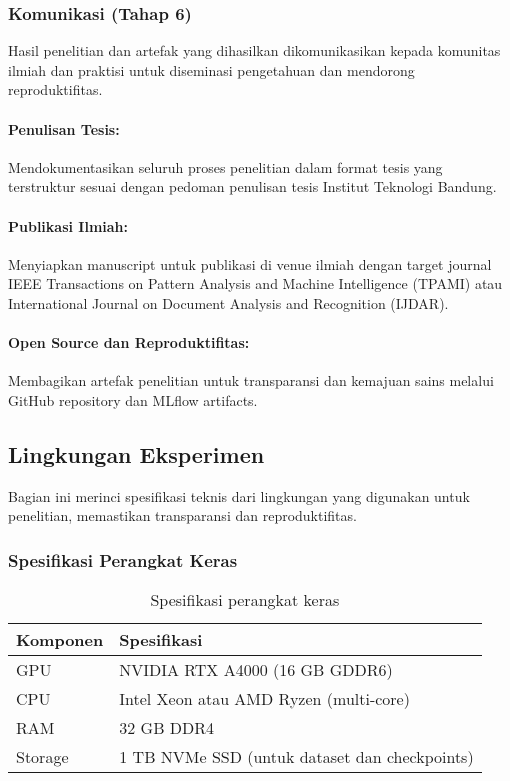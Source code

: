 \documentclass[12pt,a4paper]{article}
\begin{document}
\subsubsection{Komunikasi (Tahap 6)}
Hasil penelitian dan artefak yang dihasilkan dikomunikasikan kepada komunitas ilmiah dan praktisi untuk diseminasi pengetahuan dan mendorong reproduktifitas.

\paragraph{Penulisan Tesis:}
Mendokumentasikan seluruh proses penelitian dalam format tesis yang terstruktur sesuai dengan pedoman penulisan tesis Institut Teknologi Bandung.

\paragraph{Publikasi Ilmiah:}
Menyiapkan manuscript untuk publikasi di venue ilmiah dengan target journal IEEE Transactions on Pattern Analysis and Machine Intelligence (TPAMI) atau International Journal on Document Analysis and Recognition (IJDAR).

\paragraph{Open Source dan Reproduktifitas:}
Membagikan artefak penelitian untuk transparansi dan kemajuan sains melalui GitHub repository dan MLflow artifacts.

\subsection{Lingkungan Eksperimen}
\label{subsec:lingkungan-eksperimen}

Bagian ini merinci spesifikasi teknis dari lingkungan yang digunakan untuk penelitian, memastikan transparansi dan reproduktifitas.

\subsubsection{Spesifikasi Perangkat Keras}
\begin{table}[H]
\centering
\caption{Spesifikasi perangkat keras}
\label{tab:hardware-spec}
\small
\begin{tabular}{|l|l|}
\hline
\textbf{Komponen} & \textbf{Spesifikasi} \\ \hline
GPU & NVIDIA RTX A4000 (16 GB GDDR6) \\ \hline
CPU & Intel Xeon atau AMD Ryzen (multi-core) \\ \hline
RAM & 32 GB DDR4 \\ \hline
Storage & 1 TB NVMe SSD (untuk dataset dan checkpoints) \\ \hline
\end{tabular}
\end{table}
\end{document}
